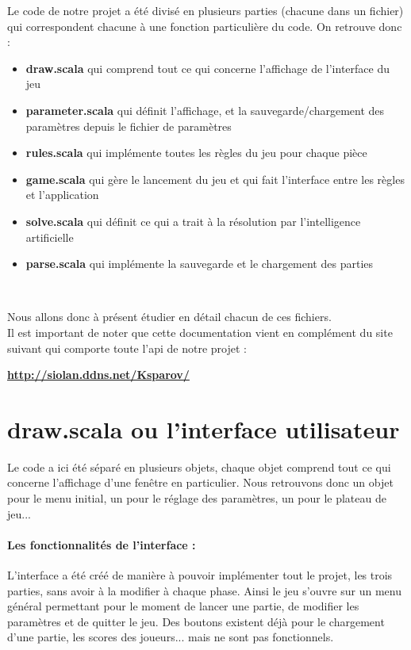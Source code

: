 \documentclass[a4paper]{article}
\begin{document}
Le code de notre projet a été divisé en plusieurs parties (chacune dans un fichier) qui correspondent chacune à une fonction particulière du code. On retrouve donc :
\begin{itemize}
\item \textbf{draw.scala} qui comprend tout ce qui concerne l'affichage de l'interface du jeu
\item \textbf{parameter.scala} qui définit l'affichage, et la sauvegarde/chargement des paramètres depuis le fichier de paramètres
\item \textbf{rules.scala} qui implémente toutes les règles du jeu pour chaque pièce
\item \textbf{game.scala} qui gère le lancement du jeu et qui fait l'interface entre les règles et l'application
\item \textbf{solve.scala} qui définit ce qui a trait à la résolution par l'intelligence artificielle
\item \textbf{parse.scala} qui implémente la sauvegarde et le chargement des parties
\end{itemize}~

Nous allons donc à présent étudier en détail chacun de ces fichiers. \\

Il est important de noter que cette documentation vient en complément du site suivant qui comporte toute l'api de notre projet : 

\begin{center}
\begin{large}
\textbf{\url{http://siolan.ddns.net/Ksparov/}}
\end{large}
\end{center}

\section{draw.scala ou l'interface utilisateur}

Le code a ici été séparé en plusieurs objets, chaque objet comprend tout ce qui concerne l'affichage d'une fenêtre en particulier. Nous retrouvons donc un objet pour le menu initial, un pour le réglage des paramètres, un pour le plateau de jeu...

\paragraph{Les fonctionnalités de l'interface :}L'interface a été créé de manière à pouvoir implémenter tout le projet, les trois parties, sans avoir à la modifier à chaque phase. Ainsi le jeu s'ouvre sur un menu général permettant pour le moment de lancer une partie, de modifier les paramètres et de quitter le jeu. Des boutons existent déjà pour le chargement d'une partie, les scores des joueurs... mais ne sont pas fonctionnels. \\
\end{document}
